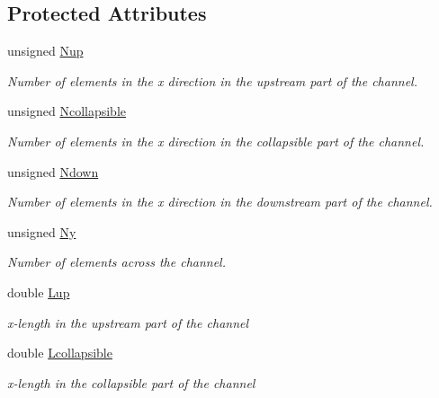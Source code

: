 \subsection*{Protected Attributes}
\begin{DoxyCompactItemize}
\item 
unsigned \hyperlink{classFSICollapsibleChannelProblem_a22a5ea767bf0c437b78ed4e37b7a4818}{Nup}
\begin{DoxyCompactList}\small\item\em Number of elements in the x direction in the upstream part of the channel. \end{DoxyCompactList}\item 
unsigned \hyperlink{classFSICollapsibleChannelProblem_a3fb9656feb1c32045f4fdbd74f91258f}{Ncollapsible}
\begin{DoxyCompactList}\small\item\em Number of elements in the x direction in the collapsible part of the channel. \end{DoxyCompactList}\item 
unsigned \hyperlink{classFSICollapsibleChannelProblem_a64c0aa974b39527ef22e352a4f22b156}{Ndown}
\begin{DoxyCompactList}\small\item\em Number of elements in the x direction in the downstream part of the channel. \end{DoxyCompactList}\item 
unsigned \hyperlink{classFSICollapsibleChannelProblem_a536804b714fd0033f3028ff1c6032918}{Ny}
\begin{DoxyCompactList}\small\item\em Number of elements across the channel. \end{DoxyCompactList}\item 
double \hyperlink{classFSICollapsibleChannelProblem_a7b8288e57097875d247bda6201b1bfcf}{Lup}
\begin{DoxyCompactList}\small\item\em x-\/length in the upstream part of the channel \end{DoxyCompactList}\item 
double \hyperlink{classFSICollapsibleChannelProblem_ae6ce3834d06f0fb75db945a782ff0108}{Lcollapsible}
\begin{DoxyCompactList}\small\item\em x-\/length in the collapsible part of the channel \end{DoxyCompactList}\item 

\end{DoxyCompactItemize}
